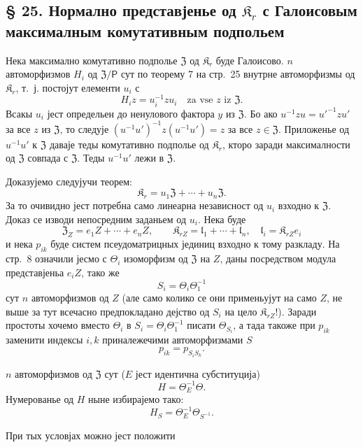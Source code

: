 \documentclass[11pt]{article}
\begin{document}
\subsection*{§ 25. Нормално представјенье од \(\mathfrak K_r\) с Галоисовым максималным комутативным подпольем\protect\footnotemark}
\label{normaldarstellung-von-r_r-mit-galoisschem-maximalem-kommutativem-teilkoerper-1}

Нека максимално комутативно подполье \(\mathfrak Z\) од \(\mathfrak K_r\) буде Галоисово. \(n\) автоморфизмов \(H_i\) од \(\mathfrak Z/\mathsf P\) сут по теорему 7 на стр.~25 внутрне автоморфизмы од \(\mathfrak K_r\), т.~ј. постојут елементи \(u_i\) с
\[
H_i z=u_i^{-1}zu_i\quad\text{za vse }z\text{ iz }\mathfrak Z.
\]
Всакы \(u_i\) јест определьен до ненулового фактора \(y\) из \(\mathfrak Z\). Бо ако \(u^{-1}zu=u'^{-1}zu'\) за все \(z\) из \(\mathfrak Z\), то следује \((u^{-1}u')^{-1}z(u^{-1}u')=z\) за все \(z\in\mathfrak Z\). Приложенье од \(u^{-1}u'\) к \(\mathfrak Z\) даваје теды комутативно подполье од \(\mathfrak K_r\), кторо заради максималности од \(\mathfrak Z\) совпада с \(\mathfrak Z\). Теды \(u^{-1}u'\) лежи в \(\mathfrak Z\).

Доказујемо следујучи теорем:
\[
\mathfrak K_r=u_1\mathfrak Z+\cdots+u_n\mathfrak Z.
\]
За то очивидно јест потребна само линеарна независност од \(u_i\) взходно к \(\mathfrak Z\). Доказ се изводи непосредним заданьем од \(u_i\). Нека буде
\[
\mathfrak Z_Z=e_1Z+\cdots+e_nZ,\qquad
\mathfrak K_{rZ}=\mathfrak l_1+\cdots+\mathfrak l_n,\quad
\mathfrak l_i=\mathfrak K_{rZ}e_i
\]
и нека \(p_{ik}\) буде систем псеудоматрицных јединиц взходно к тому разкладу. На стр.~8 означили јесмо с \(\Theta_i\) изоморфизм од \(\mathfrak Z\) на \(Z\), даны посредством модула представјеньа \(e_iZ\), тако же
\[
S_i=\Theta_i\Theta_1^{-1}
\]
сут \(n\) автоморфизмов од \(Z\) (але само колико се они применьујут на само \(Z\), не выше за тут всечасно предпокладано дејство од \(S_i\) на цело \(\mathfrak K_{rZ}\)!). Заради простоты хочемо вместо \(\Theta_i\) в \(S_i=\Theta_i\Theta_1^{-1}\) писати \(\Theta_{S_i}\), а тада такоже при \(p_{ik}\) заменити индексы \(i,k\) приналежечими автоморфизмами \(S\)
\[
p_{ik}=p_{S_iS_k}.
\]

\(n\) автоморфизмов од \(\mathfrak Z\) сут (\(E\) јест идентична субституција)
\[
H=\Theta_E^{-1}\Theta.
\]
Нумерованье од \(H\) ныне избирајемо тако:
\[
H_S=\Theta_E^{-1}\Theta_{S^{-1}}.
\]

При тых условјах можно јест положити
\end{document}
